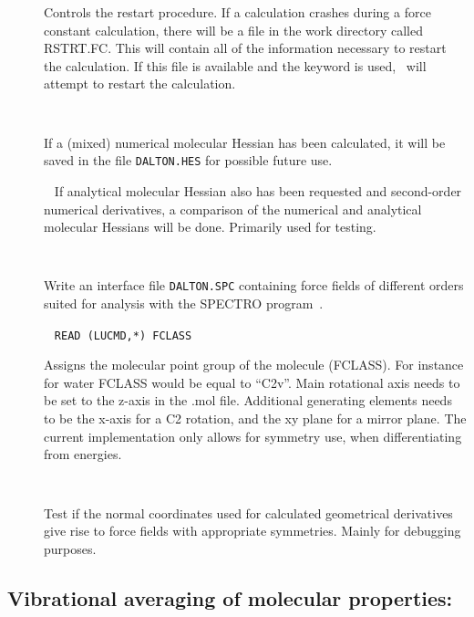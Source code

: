\begin{description}
\item[]
Controls the restart procedure. If a calculation crashes during a
force constant calculation, there will be a file in the work directory
called RSTRT.FC. This will contain all of the information necessary to
restart the calculation. If this file is available and the keyword is
used, \dalton\ will attempt to restart the calculation.

\item[]\verb| |\newline

If a (mixed) numerical molecular Hessian has been calculated, it will be saved
in the file \verb|DALTON.HES| for possible future use.

\item[]\verb| |\newline
If analytical molecular Hessian also has been requested and second-order
numerical derivatives, a comparison of the numerical and analytical
molecular Hessians will be done. Primarily used for testing.

\item[]\verb| |\newline

Write an interface file \verb|DALTON.SPC| containing force fields of
different orders suited for analysis with the SPECTRO
program~\cite{spectroref}.

\item[]\verb| |\newline
\verb|READ (LUCMD,*) FCLASS|

Assigns the molecular point group of the molecule (FCLASS). For
instance for water FCLASS would be equal to ``C2v''. Main rotational
axis needs to be set to the z-axis in the .mol file. Additional
generating elements needs to be the x-axis for a C2 rotation, and the
xy plane for a mirror plane. The current implementation only allows
for symmetry use, when differentiating from energies.

\item[]\verb| |\newline

Test if the normal coordinates used for calculated geometrical
derivatives give rise to force fields with appropriate
symmetries. Mainly for debugging purposes.

\end{description}

\subsection{Vibrational averaging of molecular properties: }
\label{sec:nmddrv.propan}

